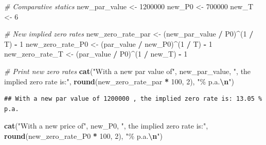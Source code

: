 \documentclass[
]{book}
\newenvironment{Shaded}{\begin{snugshade}}{\end{snugshade}}
\newcommand{\CommentTok}[1]{\textcolor[rgb]{0.56,0.35,0.01}{\textit{#1}}}
\newcommand{\DecValTok}[1]{\textcolor[rgb]{0.00,0.00,0.81}{#1}}
\newcommand{\FunctionTok}[1]{\textcolor[rgb]{0.13,0.29,0.53}{\textbf{#1}}}
\newcommand{\NormalTok}[1]{#1}
\newcommand{\OtherTok}[1]{\textcolor[rgb]{0.56,0.35,0.01}{#1}}
\newcommand{\SpecialCharTok}[1]{\textcolor[rgb]{0.81,0.36,0.00}{\textbf{#1}}}
\newcommand{\StringTok}[1]{\textcolor[rgb]{0.31,0.60,0.02}{#1}}
\begin{document}
\begin{Shaded}
\begin{Highlighting}[]
\CommentTok{\# Comparative statics}
\NormalTok{new\_par\_value }\OtherTok{\textless{}{-}} \DecValTok{1200000}
\NormalTok{new\_P0 }\OtherTok{\textless{}{-}} \DecValTok{700000}
\NormalTok{new\_T }\OtherTok{\textless{}{-}} \DecValTok{6}

\CommentTok{\# New implied zero rates}
\NormalTok{new\_zero\_rate\_par }\OtherTok{\textless{}{-}}\NormalTok{ (new\_par\_value }\SpecialCharTok{/}\NormalTok{ P0)}\SpecialCharTok{\^{}}\NormalTok{(}\DecValTok{1} \SpecialCharTok{/}\NormalTok{ T) }\SpecialCharTok{{-}} \DecValTok{1}
\NormalTok{new\_zero\_rate\_P0  }\OtherTok{\textless{}{-}}\NormalTok{ (par\_value     }\SpecialCharTok{/}\NormalTok{ new\_P0)}\SpecialCharTok{\^{}}\NormalTok{(}\DecValTok{1} \SpecialCharTok{/}\NormalTok{ T) }\SpecialCharTok{{-}} \DecValTok{1}
\NormalTok{new\_zero\_rate\_T   }\OtherTok{\textless{}{-}}\NormalTok{ (par\_value     }\SpecialCharTok{/}\NormalTok{ P0)}\SpecialCharTok{\^{}}\NormalTok{(}\DecValTok{1} \SpecialCharTok{/}\NormalTok{ new\_T) }\SpecialCharTok{{-}} \DecValTok{1}

\CommentTok{\# Print new zero rates}
\FunctionTok{cat}\NormalTok{(}\StringTok{"With a new par value of"}\NormalTok{, new\_par\_value, }\StringTok{", the implied zero rate is:"}\NormalTok{, }\FunctionTok{round}\NormalTok{(new\_zero\_rate\_par }\SpecialCharTok{*} \DecValTok{100}\NormalTok{, }\DecValTok{2}\NormalTok{), }\StringTok{"\% p.a.}\SpecialCharTok{\textbackslash{}n}\StringTok{"}\NormalTok{)}
\end{Highlighting}
\end{Shaded}

\begin{verbatim}
## With a new par value of 1200000 , the implied zero rate is: 13.05 % p.a.
\end{verbatim}

\begin{Shaded}
\begin{Highlighting}[]
\FunctionTok{cat}\NormalTok{(}\StringTok{"With a new price of"}\NormalTok{, new\_P0, }\StringTok{", the implied zero rate is:"}\NormalTok{, }\FunctionTok{round}\NormalTok{(new\_zero\_rate\_P0 }\SpecialCharTok{*} \DecValTok{100}\NormalTok{, }\DecValTok{2}\NormalTok{), }\StringTok{"\% p.a.}\SpecialCharTok{\textbackslash{}n}\StringTok{"}\NormalTok{)}
\end{Highlighting}
\end{Shaded}
\end{document}
